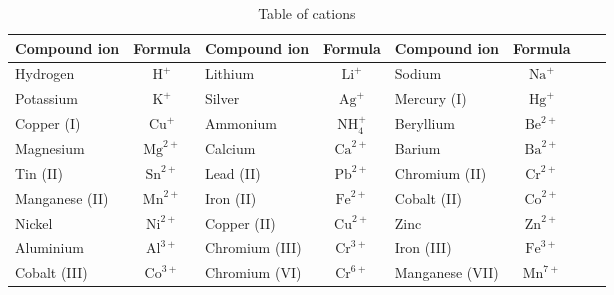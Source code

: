 \begin{enumerate}[noitemsep, label=\textbf{\arabic*}. ]
\begin{table}[H]
\begin{center}
\label{tab:cations}
\begin{tabular}{|l|c|l|c|l|c|l|c|} \hline
\textbf{Compound ion} & \textbf{Formula} & \textbf{Compound ion} & \textbf{Formula} & \textbf{Compound ion} & \textbf{Formula}  \\ \hline
Hydrogen       & $\text{H}^{+}$   & Lithium        & $\text{Li}^{+}$     & Sodium          & $\text{Na}^{+}$  \\ \hline
Potassium      & $\text{K}^{+}$   & Silver         & $\text{Ag}^{+}$     & Mercury (I)     & $\text{Hg}^{+}$  \\ \hline
Copper (I)     & $\text{Cu}^{+}$  & Ammonium       & $\text{NH}_{4}^{+}$ & Beryllium       & $\text{Be}^{2+}$ \\ \hline
Magnesium      & $\text{Mg}^{2+}$ & Calcium        & $\text{Ca}^{2+}$    & Barium          & $\text{Ba}^{2+}$ \\ \hline
Tin (II)       & $\text{Sn}^{2+}$ & Lead (II)      & $\text{Pb}^{2+}$    & Chromium (II)   & $\text{Cr}^{2+}$ \\ \hline
Manganese (II) & $\text{Mn}^{2+}$ & Iron (II)      & $\text{Fe}^{2+}$    & Cobalt (II)     & $\text{Co}^{2+}$ \\ \hline
Nickel         & $\text{Ni}^{2+}$ & Copper (II)    & $\text{Cu}^{2+}$    & Zinc            & $\text{Zn}^{2+}$ \\ \hline
Aluminium      & $\text{Al}^{3+}$ & Chromium (III) & $\text{Cr}^{3+}$    & Iron (III)      & $\text{Fe}^{3+}$ \\ \hline
Cobalt (III)   & $\text{Co}^{3+}$ & Chromium (VI)  & $\text{Cr}^{6+}$    & Manganese (VII) & $\text{Mn}^{7+}$ \\ \hline

\end{tabular}

 \end{center}
\caption{Table of cations}
\label{tab:cations}
\end{table}


\end{enumerate}
